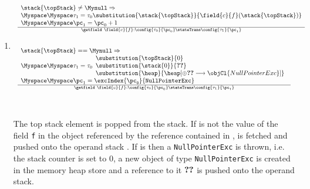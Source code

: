 \begin{itemize}
\begin{enumerate}
      \item \getfield
          $$\begin{array}{l} 
	          \frac{ \begin{array}{l}
                               \stack{\topStack} \neq \Mynull \Rightarrow \\
			       \Myspace \Myspace \tau_{1} = \tau_{0}  \substitution{\stack{\topStack} } { \field{c}{f}(\stack{\topStack} )} \\
			       \Myspace \Myspace  \pc_1  =  \pc_0 + 1 
			\end{array}
                       }   
		       { \getfield \ \field{c}{f}  : \config{\tau_{0}}{\pc_0}  \stateTrans \config{\tau_{1}}{\pc_1} } 
		       \\
		       \\
		       \\
		  \frac{\begin{array}{l}
		              \stack{\topStack } == \Mynull \Rightarrow \\
			      \Myspace \Myspace  \tau_{1} = \tau_{0}\begin{array}{l} \substitution{\topStack}{0}\\
			                                                 	 \substitution{\stack{0}}{\Ref{NullPointerExc}}  \\
			                                                         \substitution{\heap}{\heap[\oplus \Ref{NullPointerExc} \longrightarrow \objCl{NullPointerExc} ]} 
                                                                 \end{array} \\
		 	       \Myspace \Myspace    \pc_1   = \tt{ \excIndex{\pc_0 }{NullPointerExc}}\\  
                        \end{array}}
                       { \getfield \ \field{c}{f}  : \config{\tau_{0}}{\pc_0}  \stateTrans \config{\tau_{1}}{\pc_1} }
	       \end{array}   $$ \\\\
 	
	      
	      The top stack element \stack{\topStack}  is popped from the stack. If \stack{\topStack} is not \Mynull the value of the field \texttt{f}
	      in the object referenced by the reference contained in \stack{\topStack}, is fetched and pushed onto the operand stack \stack{\topStack}.
	      If \stack{\topStack} is \Mynull then a \texttt{NullPointerExc} is thrown, i.e. the stack counter is set to 0, a new object of type
	      \texttt{NullPointerExc} is created in the memory heap store \heap and a reference to it $\Ref{NullPointerExc}$ is pushed onto the operand stack.
	


\end{enumerate}
\end{itemize}
